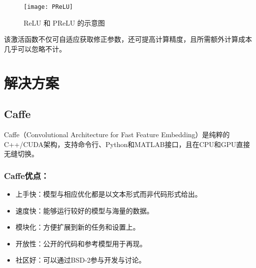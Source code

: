 \begin{figure}[!ht]
\centering
\texttt{[image: PReLU]}
\caption{ReLU 和 PReLU 的示意图}
\end{figure}

该激活函数不仅可自适应获取修正参数，还可提高计算精度，且所需额外计算成本几乎可以忽略不计。

\section{解决方案}
\subsection{Caffe}
Caffe（Convolutional Architecture for Fast Feature Embedding）是纯粹的C++/CUDA架构，支持命令行、Python和MATLAB接口，且在CPU和GPU直接无缝切换。
\subsubsection{Caffe优点：}
\begin{itemize}
\item 上手快：模型与相应优化都是以文本形式而非代码形式给出。
\item 速度快：能够运行较好的模型与海量的数据。
\item 模块化：方便扩展到新的任务和设置上。
\item 开放性：公开的代码和参考模型用于再现。
\item 社区好：可以通过BSD-2参与开发与讨论。
\end{itemize}





